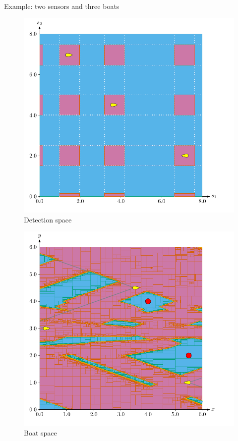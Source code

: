\documentclass{beamer}
\begin{document}
            \begin{frame}{Example: two sensors and three boats}
                \begin{minipage}{0.45\textwidth}
                    \begin{figure}
                            \includegraphics[width=\textwidth]{imgs/ex_detection_space}
                            \caption{Detection space}
                    \end{figure}
                \end{minipage}
                \hfill
                \begin{minipage}{0.45\textwidth}
                    \begin{figure}
                            \includegraphics[width=\textwidth]{imgs/ex_boat_space}
                            \caption{Boat space}
                    \end{figure}
                \end{minipage}
            \end{frame}
\end{document}
